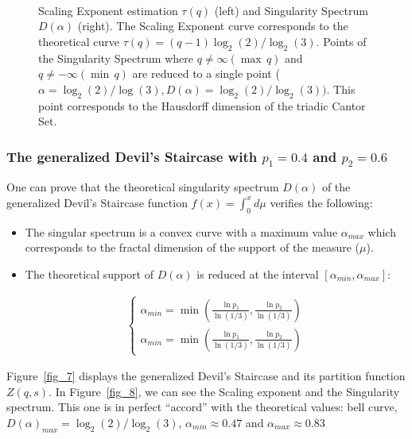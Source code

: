 \begin{figure}[htb]
\centerline{
\hbox{
}}
\caption{Scaling Exponent estimation $\tau(q)$ (left) and Singularity
Spectrum $D(\alpha)$ (right). The Scaling Exponent curve  corresponds
 to the theoretical curve
$\tau(q)=(q-1)\log_2(2)/\log_2(3)$. Points of the Singularity Spectrum
where $q \neq \infty(\max\,q)$ and  $q \neq-\infty(\min\,q)$ are reduced 
to a single point
($\alpha=\log_2(2)/\log(3), D(\alpha)=\log _2(2)/\log _2(3))$. This point
corresponds to
the Hausdorff dimension of the triadic Cantor Set.}
\label{fig_6}
\end{figure}



\subsubsection*{The generalized Devil's Staircase with $p_1=0.4$ and $p_2=0.6$}

One can prove \cite{frac:arneodo90} that the theoretical singularity spectrum $D(\alpha)$
of the generalized Devil's Staircase function $f(x)=\int_0^x{d\mu}$ verifies
the following: 
\begin{itemize}
\item The singular spectrum is a convex curve with a maximum value
$\alpha_{max}$ which corresponds to the fractal dimension of the
support of the measure ($\mu$). 
\item The theoretical support of $D(\alpha)$ is reduced at the interval
$[\alpha_{min},\alpha_{max}]$:

\begin{eqnarray}
\left\{ \begin{array}{l}
 \alpha_{min}=\min({\frac{\ln p_1}{\ln (1/3)}, \frac{\ln p_2}{\ln (1/3)}})\\
 \alpha_{min}=\min({\frac{\ln p_1}{\ln (1/3)}, \frac{\ln p_2}{\ln (1/3)}})
	\end{array}
	\right.
\end{eqnarray}
\end{itemize}

Figure~\ref{fig_7} displays the generalized Devil's Staircase and its 
partition 
function $Z(q,s)$. In Figure~\ref{fig_8}, we can see the Scaling exponent and
the Singularity spectrum. This one is in perfect ``accord'' with 
the theoretical
values: bell curve, $D(\alpha)_{max}=\log_2(2)/\log_2(3)$,
$\alpha_{min}\approx 0.47$ and $\alpha_{max}\approx 0.83$

